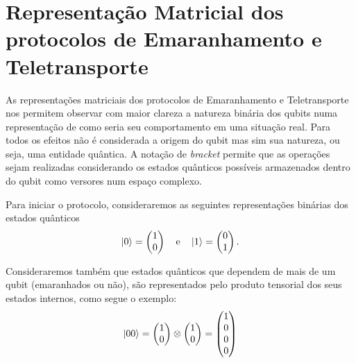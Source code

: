 
\chapter{Representação Matricial dos protocolos de Emaranhamento e Teletransporte}

As representações matriciais dos protocolos de Emaranhamento e Teletransporte nos permitem observar com maior clareza a natureza binária dos qubits numa representação de como seria seu comportamento em uma situação real. Para todos os efeitos não é considerada a origem do qubit mas sim sua natureza, ou seja, uma entidade quântica. A notação de \textit{bracket} permite que as operações sejam realizadas considerando os estados quânticos possíveis armazenados dentro do qubit como versores num espaço complexo.

Para iniciar o protocolo, consideraremos as seguintes representações binárias dos estados quânticos
\begin{equation} \label{eq:01}
\ket{0} = \begin{pmatrix}
1 \\
0
\end{pmatrix} \quad \text{e} \quad
\ket{1} = \begin{pmatrix}
0 \\
1
\end{pmatrix}.
\end{equation}

Consideraremos também que estados quânticos que dependem de mais de um qubit (emaranhados ou não), são representados pelo produto tensorial dos seus estados internos, como segue o exemplo:
\begin{equation}\label{eq:00}
\ket{00} = \begin{pmatrix}
1 \\
0
\end{pmatrix} \otimes \begin{pmatrix}
1 \\
0
\end{pmatrix} = \begin{pmatrix}
1 \\
0 \\
0 \\
0
\end{pmatrix}
\end{equation}

